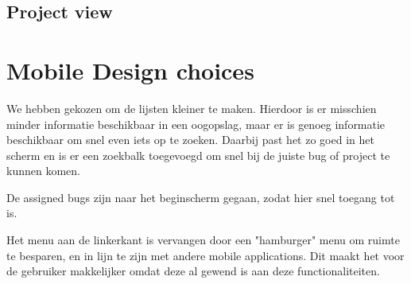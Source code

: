 \documentclass[11pt,english]{article}
\begin{document}
  \subsection{Project view}

  \section{Mobile Design choices}
  We hebben gekozen om de lijsten kleiner te maken. Hierdoor is er misschien
  minder informatie beschikbaar in een oogopslag, maar er is genoeg informatie
  beschikbaar om snel even iets op te zoeken. Daarbij past het zo goed in het
  scherm en is er een zoekbalk toegevoegd om snel bij de juiste bug of project
  te kunnen komen.

  De assigned bugs zijn naar het beginscherm gegaan, zodat hier snel toegang
  tot is.

  Het menu aan de linkerkant is vervangen door een "hamburger" menu om ruimte
  te besparen, en in lijn te zijn met andere mobile applications. Dit maakt het
  voor de gebruiker makkelijker omdat deze al gewend is aan deze
  functionaliteiten.
\end{document}
